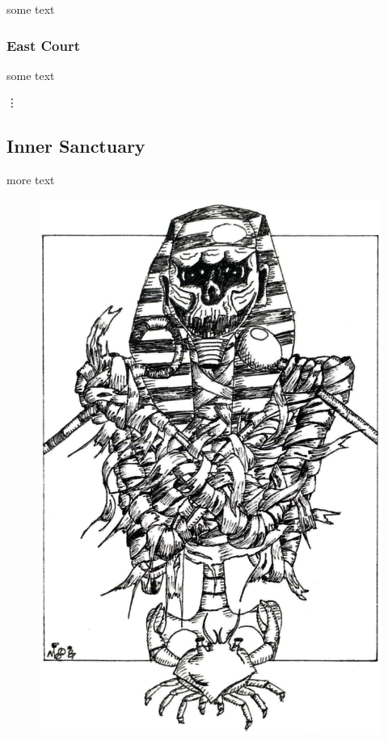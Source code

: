 \documentclass[letterpaper,serif]{module}
\begin{document}
some text

\subsubsection{East Court}                                                      %

some text

\vdots
\setcounter{subsection}{13}                                                     %

\subsection{Inner Sanctuary}                                                    %
\label{inner_sanctuary}

more text

\begin{figure}[ht]
\includegraphics[width=\columnwidth]{module_art_interior.png}
\label{img:tomb}
\end{figure}
\end{document}
